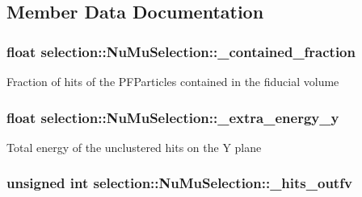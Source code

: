 \subsection{Member Data Documentation}
\hypertarget{classselection_1_1NuMuSelection_a5d7cbf03836116170b56615ab3b073c2}{
\subsubsection[{\-\_\-contained\-\_\-fraction}]{\setlength{\rightskip}{0pt plus 5cm}float selection\-::\-Nu\-Mu\-Selection\-::\-\_\-contained\-\_\-fraction\hspace{0.3cm}{\ttfamily [private]}}}\label{classselection_1_1NuMuSelection_a5d7cbf03836116170b56615ab3b073c2}
Fraction of hits of the P\-F\-Particles contained in the fiducial volume \hypertarget{classselection_1_1NuMuSelection_a9bbe9a46450cfb58e3559d943a5822c8}{
\subsubsection[{\-\_\-extra\-\_\-energy\-\_\-y}]{\setlength{\rightskip}{0pt plus 5cm}float selection\-::\-Nu\-Mu\-Selection\-::\-\_\-extra\-\_\-energy\-\_\-y\hspace{0.3cm}{\ttfamily [private]}}}\label{classselection_1_1NuMuSelection_a9bbe9a46450cfb58e3559d943a5822c8}
Total energy of the unclustered hits on the Y plane \hypertarget{classselection_1_1NuMuSelection_ac2073c16d1ba83437d9fa66b0aa3ea38}{
\subsubsection[{\-\_\-hits\-\_\-outfv}]{\setlength{\rightskip}{0pt plus 5cm}unsigned int selection\-::\-Nu\-Mu\-Selection\-::\-\_\-hits\-\_\-outfv\hspace{0.3cm}{\ttfamily [private]}}}\label{classselection_1_1NuMuSelection_ac2073c16d1ba83437d9fa66b0aa3ea38}
